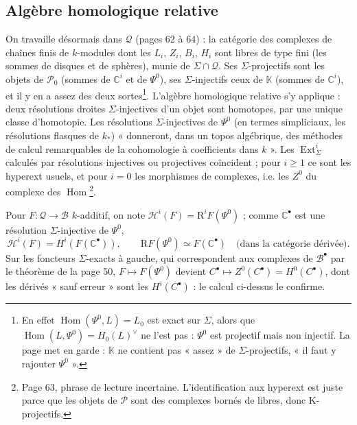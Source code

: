 \documentclass[11pt,a4paper]{article}
\begin{document}
\subsection*{Algèbre homologique relative}

On travaille désormais dans $\mathcal{Q}$ (pages 62 à 64) : la catégorie des
complexes de chaînes finis de $k$-modules dont les $L_{i}$, $Z_{i}$, $B_{i}$,
$H_{i}$ sont libres de type fini (les sommes de disques et de sphères),
munie de $\Sigma \cap \mathcal{Q}$. Ses $\Sigma$-projectifs sont les objets de
$\mathcal{P}_{0}$ (sommes de $\mathbb{C}^{i}$ et de $\Psi^{0}$), ses
$\Sigma$-injectifs ceux de $\mathbb{K}$ (sommes de $\mathbb{C}^{i}$), et il
y en a assez des deux sortes\footnote{En effet $\operatorname{Hom}(\Psi^{0},
L) = L_{0}$ est exact sur $\Sigma$, alors que $\operatorname{Hom}(L, \Psi^{0})
= H_{0}(L)^{\vee}$ ne l'est pas : $\Psi^{0}$ est projectif mais non injectif.
La page met en garde : $\mathbb{K}$ ne contient pas « assez » de
$\Sigma$-projectifs, « il faut y rajouter $\Psi^{0}$ ».}. L'algèbre
homologique relative s'y applique : deux résolutions droites
$\Sigma$-injectives d'un objet sont homotopes, par une unique classe
d'homotopie. Les résolutions $\Sigma$-injectives de $\Psi^{0}$ (en termes
simpliciaux, les résolutions flasques de $k_{*}$) « donneront, dans un topos
algébrique, des méthodes de calcul remarquables de la cohomologie à
coefficients dans $k$ ». Les $\operatorname{Ext}^{i}_{\Sigma}$ calculés par
résolutions injectives ou projectives coïncident ; pour $i \geqslant 1$ ce
sont les hyperext usuels, et pour $i = 0$ les morphismes de complexes, i.e.
les $Z^{0}$ du complexe des $\operatorname{Hom}$\footnote{Page 63, phrase de
lecture incertaine. L'identification aux hyperext est juste parce que les
objets de $\mathcal{P}$ sont des complexes bornés de libres, donc
K-projectifs.}.

Pour $F : \mathcal{Q} \to \mathcal{B}$ $k$-additif, on note
$\mathcal{H}^{i}(F) = \mathrm{R}^{i}F(\Psi^{0})$ ; comme
$\mathbb{C}^{\bullet}$ est une résolution $\Sigma$-injective de $\Psi^{0}$,
\[
  \mathcal{H}^{i}(F) = H^{i}(F(\mathbb{C}^{\bullet})), \qquad
  \mathrm{R}F(\Psi^{0}) \simeq F(\mathbb{C}^{\bullet}) \quad \text{(dans la
  catégorie dérivée)}.
\]
Sur les foncteurs $\Sigma$-exacts à gauche, qui correspondent aux complexes
de $\mathcal{B}^{\bullet}$ par le théorème de la page 50, $F \mapsto
F(\Psi^{0})$ devient $C^{\bullet} \mapsto Z^{0}(C^{\bullet}) =
H^{0}(C^{\bullet})$, dont les dérivés « sauf erreur » sont les
$H^{i}(C^{\bullet})$ : le calcul ci-dessus le confirme.
\end{document}
